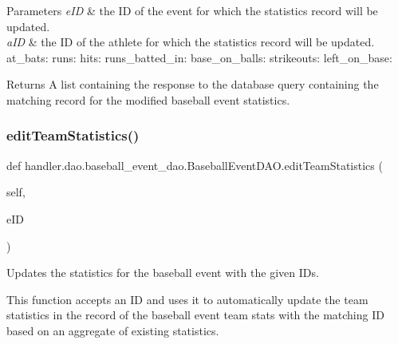 \begin{DoxyParams}{Parameters}
{\em e\+ID} & the ID of the event for which the statistics record will be updated. \\
\hline
{\em a\+ID} & the ID of the athlete for which the statistics record will be updated. at\+\_\+bats\+: runs\+: hits\+: runs\+\_\+batted\+\_\+in\+: base\+\_\+on\+\_\+balls\+: strikeouts\+: left\+\_\+on\+\_\+base\+:\\
\hline
\end{DoxyParams}
\begin{DoxyReturn}{Returns}
A list containing the response to the database query containing the matching record for the modified baseball event statistics. 
\end{DoxyReturn}
\mbox{\label{classhandler_1_1dao_1_1baseball__event__dao_1_1_baseball_event_d_a_o_a9cb569c979ad479dfb6fb53516c9fd6c}} 
\subsubsection{\texorpdfstring{edit\+Team\+Statistics()}{editTeamStatistics()}}
{\footnotesize\ttfamily def handler.\+dao.\+baseball\+\_\+event\+\_\+dao.\+Baseball\+Event\+D\+A\+O.\+edit\+Team\+Statistics (\begin{DoxyParamCaption}\item[{}]{self,  }\item[{}]{e\+ID }\end{DoxyParamCaption})}



Updates the statistics for the baseball event with the given I\+Ds. 

This function accepts an ID and uses it to automatically update the team statistics in the record of the baseball event team stats with the matching ID based on an aggregate of existing statistics.


